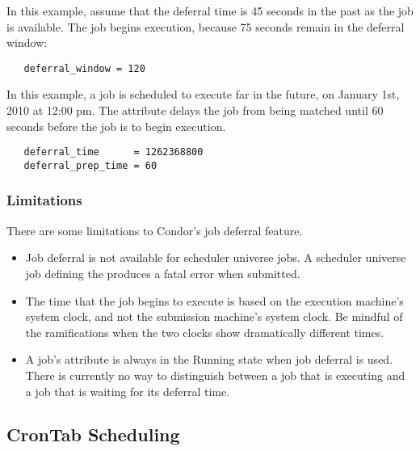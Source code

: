 In this example, assume that the deferral time is 45 seconds
in the past as the job is available.
The job begins execution, because 75 seconds remain in the
deferral window:

\begin{verbatim} 
   deferral_window = 120
\end{verbatim}

In this example, a job is scheduled to execute
far in the future,
on January 1st, 2010 at 12:00 pm. 
The  attribute delays the job 
from being matched until 60 seconds before the job is to begin execution. 

\begin{verbatim}
   deferral_time      = 1262368800
   deferral_prep_time = 60
\end{verbatim}

\subsubsection{Limitations}
\label{sec:JobDeferral-Limitations}
There are some limitations to Condor's job deferral feature.

\begin{itemize}
\item Job deferral is not available for scheduler universe jobs.
A scheduler universe job defining the 
produces a fatal error when submitted.

\item The time that the job begins to execute 
is based on the execution machine's system clock, 
and not the submission machine's system clock. 
Be mindful of the ramifications when
the two clocks show dramatically different times.

\item A job's  attribute is always in the Running state 
when job deferral is used.
There is currently no way to distinguish between a job that is 
executing and a job that is waiting for its deferral time. 

\end{itemize}

\subsection{CronTab Scheduling}
\label{sec:CronTab}

